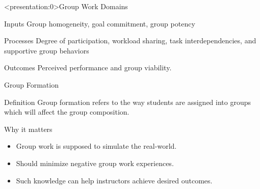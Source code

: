 \documentclass[12pt,table,aspectratio=169]{beamer}
\begin{document}
\begin{frame}<presentation:0>{Group Work Domains \cite{chapman2006}}
    \begin{alertblock}{Inputs}
    Group homogeneity, goal commitment, group potency
    \end{alertblock}
    \begin{alertblock}{Processes} Degree of participation, workload sharing, task interdependencies, and supportive group behaviors
    \end{alertblock}
    \begin{alertblock}{Outcomes} Perceived performance and group viability.
\end{alertblock}
\end{frame}

\begin{frame}{Group Formation}
\begin{alertblock}{Definition}
Group formation refers to the way students are
assigned into groups which will affect the group composition.
\end{alertblock}
\begin{alertblock}{Why it matters \cite{potosky2014}}
\addtolength{\leftmargini}{\labelsep}

    \begin{itemize}
        \item Group work is supposed to simulate the real-world.
        \item Should minimize negative group work experiences.
        \item Such knowledge can help instructors achieve desired outcomes.
\end{itemize}
\end{alertblock}
\end{frame}
\end{document}
